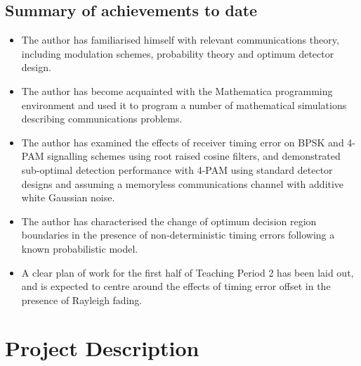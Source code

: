 
\chapter{Summary of achievements to date}

\begin{itemize}
\itemsep1pt\parskip0pt
\item
  The author has familiarised himself with relevant communications
  theory, including modulation schemes, probability theory and optimum
  detector design.
\item
  The author has become acquainted with the Mathematica programming
  environment and used it to program a number of mathematical
  simulations describing communications problems.
\item
  The author has examined the effects of receiver timing error on BPSK
  and 4-PAM signalling schemes using root raised cosine filters, and
  demonstrated sub-optimal detection performance with 4-PAM using
  standard detector designs and assuming a memoryless communications
  channel with additive white Gaussian noise.
\item
  The author has characterised the change of optimum decision region
  boundaries in the presence of non-deterministic timing errors
  following a known probabilistic model.
\item
  A clear plan of work for the first half of Teaching Period 2 has been laid out,
  and is expected to centre around the effects of timing error offset in the
  presence of Rayleigh fading.
\end{itemize}


\part{Project Description}

